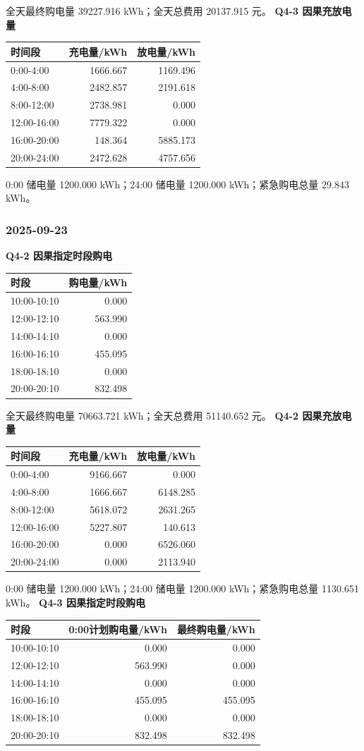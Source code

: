 全天最终购电量 39227.916 kWh；全天总费用 20137.915 元。
\textbf{Q4-3 因果充放电量}
\begin{longtable}[]{@{}lrr@{}}\toprule 时间段&充电量/kWh&放电量/kWh\\\midrule\endhead
0:00-4:00&1666.667&1169.496\\4:00-8:00&2482.857&2191.618\\8:00-12:00&2738.981&0.000\\12:00-16:00&7779.322&0.000\\16:00-20:00&148.364&5885.173\\20:00-24:00&2472.628&4757.656\\\bottomrule\end{longtable}
0:00 储电量 1200.000 kWh；24:00 储电量 1200.000 kWh；紧急购电总量 29.843 kWh。

\subsubsection{2025-09-23}
\textbf{Q4-2 因果指定时段购电}
\begin{longtable}[]{@{}lr@{}}\toprule 时段&购电量/kWh\\\midrule\endhead
10:00-10:10&0.000\\12:00-12:10&563.990\\14:00-14:10&0.000\\16:00-16:10&455.095\\18:00-18:10&0.000\\20:00-20:10&832.498\\\bottomrule\end{longtable}
全天最终购电量 70663.721 kWh；全天总费用 51140.652 元。
\textbf{Q4-2 因果充放电量}
\begin{longtable}[]{@{}lrr@{}}\toprule 时间段&充电量/kWh&放电量/kWh\\\midrule\endhead
0:00-4:00&9166.667&0.000\\4:00-8:00&1666.667&6148.285\\8:00-12:00&5618.072&2631.265\\12:00-16:00&5227.807&140.613\\16:00-20:00&0.000&6526.060\\20:00-24:00&0.000&2113.940\\\bottomrule\end{longtable}
0:00 储电量 1200.000 kWh；24:00 储电量 1200.000 kWh；紧急购电总量 1130.651 kWh。
\textbf{Q4-3 因果指定时段购电}
\begin{longtable}[]{@{}lrr@{}}\toprule 时段&0:00计划购电量/kWh&最终购电量/kWh\\\midrule\endhead
10:00-10:10&0.000&0.000\\12:00-12:10&563.990&0.000\\14:00-14:10&0.000&0.000\\16:00-16:10&455.095&455.095\\18:00-18:10&0.000&0.000\\20:00-20:10&832.498&832.498\\\bottomrule\end{longtable}
